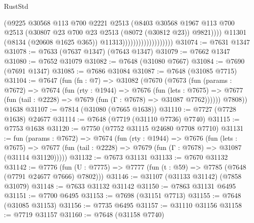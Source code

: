 \begin{lexlean}{RustStd}
\begin{coremodule}
                                            (@9225
                                              @30568
                                              @113
                                              @700
                                              @2221
                                              @2513
                                              (@8403
                                                @30568
                                                @1967
                                                @113
                                                @700
                                                @2513
                                                (@30807
                                                  @23
                                                  @700
                                                  @23
                                                  @2513
                                                  (@8072 (@30812 @23))
                                                  @9821))))
                                          @11301
                                          (@8134 (@20608 @1625 @365))
                                          @11313)))))))))))))))))))
@31074 := @7631 @1347
@31078 := @7633 (@7637 @1347) (@7643 @1347)
@31079 := @7662 @1347
@31080 := @7652 @31079
@31082 := @7648 (@31080 @7667)
@31084 := @7690 (@7691 @1347)
@31085 := @7686 @31084
@31087 := @7648 (@31085 @7715)
@31104 := @7647
    (fun (fn : @7) =>
    @31082
      (@7670
        (@7673
          (fun (params : @7672) =>
          @7674
            (fun (rty : @1944) =>
            @7676
              (fun (lets : @7675) =>
              @7677 (fun (tail : @2228) => @7679 (fun (Γ : @7678) => @31087 @7762))))))
        @7808))
    @1638
@31107 := @7814 (@31080 (@7665 @1638))
@31110 := @7727 (@7728 @1638) @24677
@31114 := @7648 (@7719 (@31110 @7736) @7740)
@31115 := @7753 @1638
@31120 := @7750 (@7752 @31115 @24680 @7708 @7710)
@31131 := fun (params : @7672) =>
  @7674
    (fun (rty : @1944) =>
    @7676
      (fun (lets : @7675) =>
      @7677 (fun (tail : @2228) => @7679 (fun (Γ : @7678) => @31087 (@31114 @31120)))))
@31132 := @7673 @31131
@31133 := @7670 @31132
@31142 := @7776
    (fun (U : @7775) => @7777 (fun (t : @59) => @7785 (@7648 (@7791 @24677 @7666) @7802)))
@31146 := @31107 (@31133 @31142) (@7858 @31079)
@31148 := @7633 @31132 @31142
@31150 := @7863 @31131 @6495
@31151 := @7700 @6495
@31153 := @7698 (@31151 @7713)
@31155 := @7648 (@31085 @31153)
@31156 := @7735 @6495
@31157 := @31110 @31156
@31158 := @7719 @31157
@31160 := @7648 (@31158 @7740)

\end{coremodule}
\end{lexlean}
